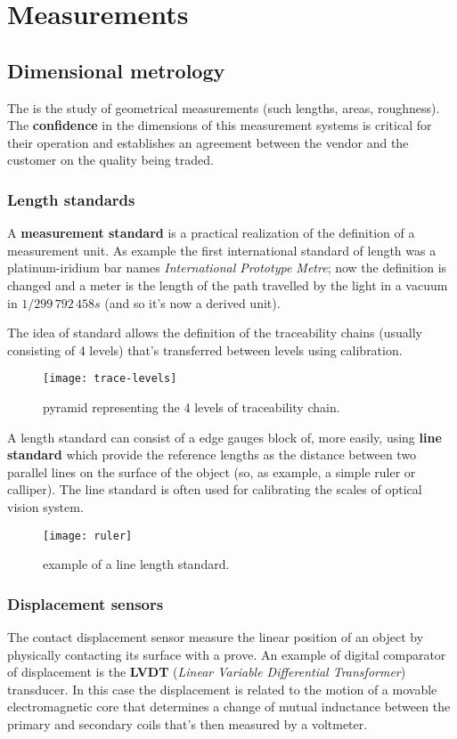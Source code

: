 \chapter{Measurements}
\section{Dimensional metrology}
	The  is the study of geometrical measurements (such lengths, areas, roughness). The \textbf{confidence} in the dimensions of this measurement systems is critical for their operation and establishes an agreement between the vendor and the customer on the quality being traded.
	
\subsection*{Length standards}
	A \textbf{measurement standard} is a practical realization of the definition of a measurement unit. As example the first international standard of length was a platinum-iridium bar names \textit{International Prototype Metre}; now the definition is changed and a meter is the length of the path travelled by the light in a vacuum in $1/299\,792\,458s $ (and so it's now a derived unit).
	
	The idea of standard allows the definition of the traceability chains (usually consisting of 4 levels) that's transferred between levels using calibration.
	
	\begin{SCfigure}[1][bht]
		\centering \texttt{[image: trace-levels]}
		\caption{pyramid representing the 4 levels of traceability chain.}
	\end{SCfigure}
	
	A length standard can consist of a edge gauges block of, more easily, using \textbf{line standard} which provide the reference lengths as the distance between two parallel lines on the surface of the object (so, as example, a simple ruler or calliper). The line standard is often used for calibrating the scales of optical vision system.
	
	\begin{SCfigure}[2][bht]
		\centering \texttt{[image: ruler]}
		\caption{example of a line length standard.}
	\end{SCfigure}
	
\subsection{Displacement sensors} 
	The contact displacement sensor measure the linear position of an object by physically contacting its surface with a prove. An example of digital comparator of displacement is the \textbf{LVDT} (\textit{Linear Variable Differential Transformer}) transducer. In this case the displacement is related to the motion of a movable electromagnetic core that determines a change of mutual inductance between the primary and secondary coils that's then measured by a voltmeter.
	
